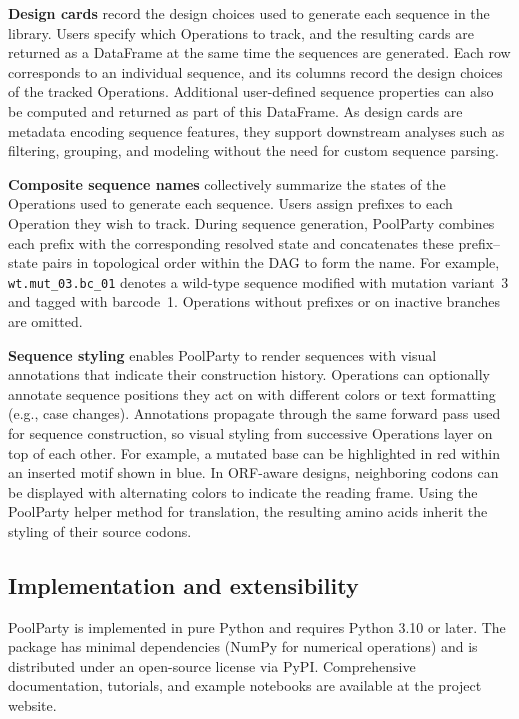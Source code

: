 \documentclass[unnumsec,webpdf,modern,large]{mam-authoring-template}%
\theoremstyle{thmstyleone}%
\theoremstyle{thmstyletwo}%
\theoremstyle{thmstylethree}%
\begin{document}
\textbf{Design cards} record the design choices used to generate each sequence in the library. Users specify which Operations to track, and the resulting cards are returned as a DataFrame at the same time the sequences are generated. Each row corresponds to an individual sequence, and its columns record the design choices of the tracked Operations. Additional user-defined sequence properties can also be computed and returned as part of this DataFrame. As design cards are metadata encoding sequence features, they support downstream analyses such as filtering, grouping, and modeling without the need for custom sequence parsing.

\textbf{Composite sequence names} collectively summarize the states of the Operations used to generate each sequence. Users assign prefixes to each Operation they wish to track. During sequence generation, PoolParty combines each prefix with the corresponding resolved state and concatenates these prefix--state pairs in topological order within the DAG to form the name. For example, \texttt{wt.mut\_03.bc\_01} denotes a wild-type sequence modified with mutation variant~3 and tagged with barcode~1. Operations without prefixes or on inactive branches are omitted.

\textbf{Sequence styling} enables PoolParty to render sequences with visual annotations that indicate their construction history. Operations can optionally annotate sequence positions they act on with different colors or text formatting (e.g., case changes). Annotations propagate through the same forward pass used for sequence construction, so visual styling from successive Operations layer on top of each other. For example, a mutated base can be highlighted in red within an inserted motif shown in blue. In ORF-aware designs, neighboring codons can be displayed with alternating colors to indicate the reading frame. Using the PoolParty helper method for translation, the resulting amino acids inherit the styling of their source codons.

\subsection{Implementation and extensibility}

PoolParty is implemented in pure Python and requires Python 3.10 or later. The package has minimal dependencies (NumPy for numerical operations) and is distributed under an open-source license via PyPI. Comprehensive documentation, tutorials, and example notebooks are available at the project website.
\end{document}
